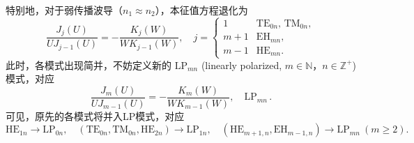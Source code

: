 特别地，对于弱传播波导（\(n_1\approx n_2\)），本征值方程退化为
\begin{equation*}
	\dfrac{J_j(U)}{U J_{j-1}(U)} = -\dfrac{K_j(W)}{W K_{j-1}(W)}, \quad j =
	\begin{cases}
		1   & \mathrm{TE}_{0n}, \, \mathrm{TM}_{0n} , \\
		m+1 & \mathrm{EH}_{mn} ,                      \\
		m-1 & \mathrm{HE}_{mn} .
	\end{cases}
\end{equation*}
此时，各模式出现简并，不妨定义新的 \(\mathrm{LP}_{mn}\) (linearly polarized, \(m \in \mathbb{N}\)，\(n \in \mathbb{Z}^+\)) 模式，对应
\begin{equation*}
	\dfrac{J_m(U)}{U J_{m-1}(U)} = -\dfrac{K_m(W)}{W K_{m-1}(W)}, \quad \mathrm{LP}_{mn} \, .
\end{equation*}
可见，原先的各模式将并入LP模式，对应
\begin{equation*}
	\mathrm{HE}_{1n} \to \mathrm{LP}_{0n},\quad (\mathrm{TE}_{0n}, \mathrm{TM}_{0n}, \mathrm{HE}_{2n}) \to \mathrm{LP}_{1n},\quad (\mathrm{HE}_{m+1,n}, \mathrm{EH}_{m-1,n}) \to \mathrm{LP}_{mn}\ (m \geq 2).
\end{equation*}

